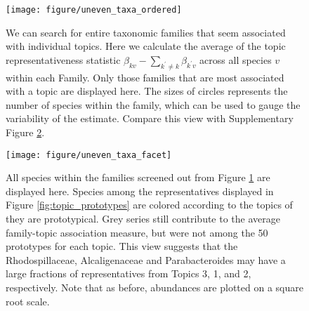 \documentclass[oupdraft]{bio}
\begin{document}
\begin{figure}[!p]
  \centering
  \texttt{[image: figure/uneven\_taxa\_ordered]}
  \caption{We can search for entire taxonomic families that seem associated with
    individual topics. Here we calculate the average of the topic
    representativeness statistic $\beta_{kv} - \sum_{k^{\prime} \neq k}
    \beta_{k^{\prime} v}$ across all species $v$ within each
    Family. Only those families that are most associated with a topic are
    displayed here. The sizes of circles represents the number of species within
    the family, which can be used to gauge the variability of the
    estimate. Compare this view with Supplementary Figure
    \ref{fig:uneven_taxa_facet}. \label{fig:uneven_taxa_ordered} }
\end{figure}

\begin{figure}[!p]
  \centering
  \texttt{[image: figure/uneven\_taxa\_facet]}
  \caption{All species within the families screened out from Figure
    \ref{fig:uneven_taxa_ordered} are displayed here. Species among the
    representatives displayed in Figure \ref{fig:topic_prototypes} are colored
    according to the topics of they are prototypical. Grey series still
    contribute to the average family-topic association measure, but were not
    among the 50 prototypes for each topic. This view suggests that the
    Rhodospillaceae, Alcaligenaceae and Parabacteroides may have a large
    fractions of representatives from Topics 3, 1, and 2, respectively. Note
    that as before, abundances are plotted on a square root
    scale. \label{fig:uneven_taxa_facet} }
\end{figure}
\end{document}
